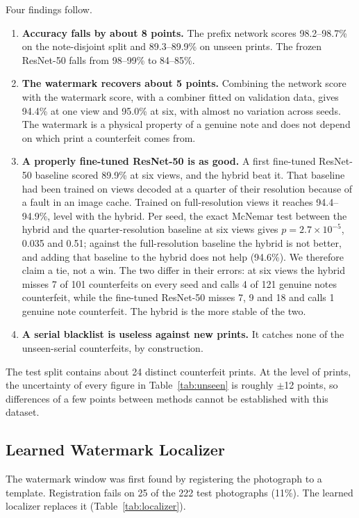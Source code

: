 Four findings follow.
\begin{enumerate}[noitemsep]
    \item \textbf{Accuracy falls by about 8 points.} The prefix network scores 98.2--98.7\% on the note-disjoint split and 89.3--89.9\% on unseen prints. The frozen ResNet-50 falls from 98--99\% to 84--85\%.
    \item \textbf{The watermark recovers about 5 points.} Combining the network score with the watermark score, with a combiner fitted on validation data, gives 94.4\% at one view and 95.0\% at six, with almost no variation across seeds. The watermark is a physical property of a genuine note and does not depend on which print a counterfeit comes from.
    \item \textbf{A properly fine-tuned ResNet-50 is as good.} A first fine-tuned ResNet-50 baseline scored 89.9\% at six views, and the hybrid beat it. That baseline had been trained on views decoded at a quarter of their resolution because of a fault in an image cache. Trained on full-resolution views it reaches 94.4--94.9\%, level with the hybrid. Per seed, the exact McNemar test between the hybrid and the quarter-resolution baseline at six views gives $p = 2.7\times10^{-5}$, 0.035 and 0.51; against the full-resolution baseline the hybrid is not better, and adding that baseline to the hybrid does not help (94.6\%). We therefore claim a tie, not a win. The two differ in their errors: at six views the hybrid misses 7 of 101 counterfeits on every seed and calls 4 of 121 genuine notes counterfeit, while the fine-tuned ResNet-50 misses 7, 9 and 18 and calls 1 genuine note counterfeit. The hybrid is the more stable of the two.
    \item \textbf{A serial blacklist is useless against new prints.} It catches none of the unseen-serial counterfeits, by construction.
\end{enumerate}
The test split contains about 24 distinct counterfeit prints. At the level of prints, the uncertainty of every figure in Table~\ref{tab:unseen} is roughly $\pm$12 points, so differences of a few points between methods cannot be established with this dataset.

\subsection{Learned Watermark Localizer}
The watermark window was first found by registering the photograph to a template. Registration fails on 25 of the 222 test photographs (11\%). The learned localizer replaces it (Table~\ref{tab:localizer}).

